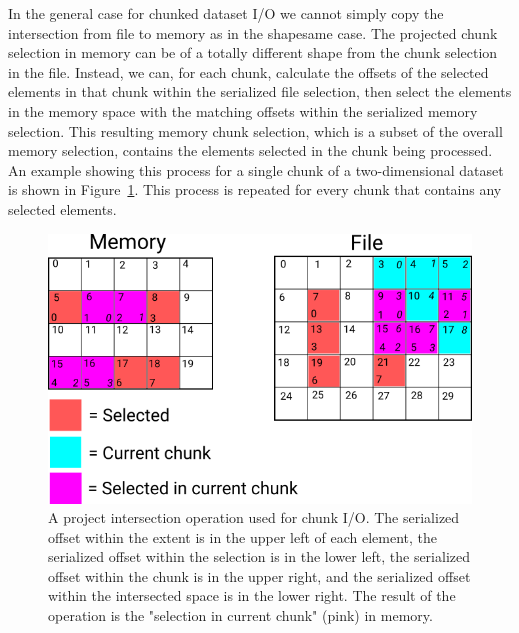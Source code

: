 \begin{itemize}

In the general case for chunked dataset I/O we cannot simply copy the intersection from file to memory as in the shapesame case. The projected chunk selection in memory can be of a totally different shape from the chunk selection in the file. Instead, we can, for each chunk, calculate the offsets of the selected elements in that chunk within the serialized file selection, then select the elements in the memory space with the matching offsets within the serialized memory selection. This resulting memory chunk selection, which is a subset of the overall memory selection, contains the elements selected in the chunk being processed. An example showing this process for a single chunk of a two-dimensional dataset is shown in Figure~\ref{fig:project-intersection-chunk}. This process is repeated for every chunk that contains any selected elements. 

\begin{figure}[h]
\centering
\includegraphics[scale=0.8]{images/Project_intersection_chunk.png}
\caption{A project intersection operation used for chunk I/O. The serialized offset within the extent is in the upper left of each element, the serialized offset within the selection is in the lower left, the serialized offset within the chunk is in the upper right, and the serialized offset within the intersected space is in the lower right. The result of the operation is the "selection in current chunk" (pink) in memory.}
\label{fig:project-intersection-chunk}
\end{figure}


\end{itemize}
